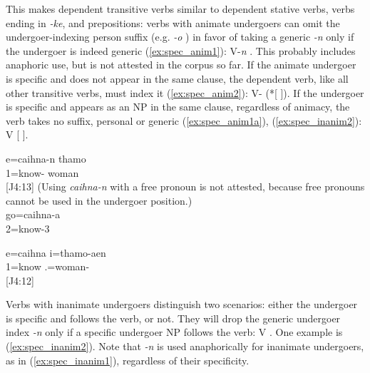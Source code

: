 \begin{sloppypar}
This makes dependent transitive verbs similar to dependent stative verbs, verbs ending in \textit{-ke}, and prepositions: verbs with animate undergoers can omit the undergoer-indexing person suffix (e.g. \textit{-o} ) in favor of taking a generic \textit{-n} only if the undergoer %
is indeed generic (\ref{ex:spec_anim1}): V-\textit{n} \textsubscript{}. This probably includes anaphoric use, but is not attested in the corpus so far. If the animate undergoer is specific and does not appear in the same clause, the dependent verb, like all other transitive verbs, must index it (\ref{ex:spec_anim2}): V- (*[ \textsubscript{}]). If the undergoer is specific and appears as an NP in the same clause, regardless of animacy, the verb takes no suffix, personal or generic (\ref{ex:spec_anim1a}), (\ref{ex:spec_inanim2}): V [ ].
\end{sloppypar}

\ea 
\ea \label{ex:spec_anim1}
\gll e=caihna-n thamo\\
 1=know-	woman	\\
\glt {}	 {[J4:13]}	
\ex \label{ex:spec_anim2} (Using \textit{caihna-n} with a free pronoun is not attested, %
because free pronouns cannot be used in the undergoer position.)\\
\gll go=caihna-a	\\
 2=know-3	\\
\glt	{}
\z
\z



\ea\label{ex:spec_anim1a}\gll e=caihna i=thamo-aen\\
 1=know .=woman-	\\
\glt {}	{[J4:12]}
\z

Verbs with inanimate undergoers distinguish two scenarios: either the undergoer is specific and follows the verb, or not. They will drop the generic undergoer index \textit{-n} only if a specific undergoer NP follows the verb: V  \textsubscript{}. One example is (\ref{ex:spec_inanim2}). Note that \textit{-n} is used anaphorically for inanimate undergoers, as in (\ref{ex:spec_inanim1}), regardless of their specificity.

